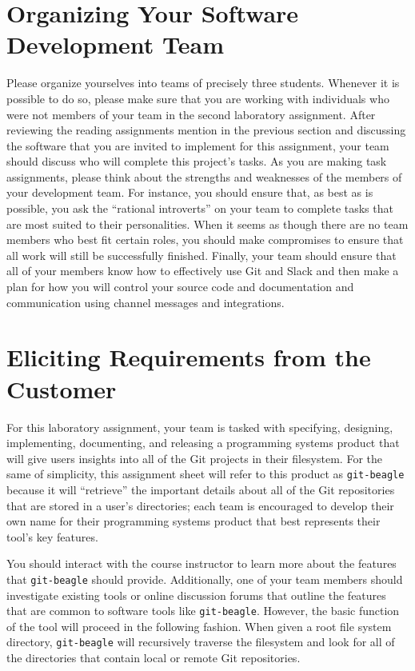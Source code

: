 \section*{Organizing Your Software Development Team}

Please organize yourselves into teams of precisely three students. Whenever it is possible to do so, please make sure that you are
working with individuals who were not members of your team in the second laboratory assignment. After reviewing the
reading assignments mention in the previous section and discussing the software that you are invited to implement for
this assignment, your team should discuss who will complete this project's tasks. As you are making task assignments,
please think about the strengths and weaknesses of the members of your development team. For instance, you should ensure
that, as best as is possible, you ask the ``rational introverts'' on your team to complete tasks that are most suited to
their personalities. When it seems as though there are no team members who best fit certain roles, you should make
compromises to ensure that all work will still be successfully finished. Finally, your team should ensure that all of
your members know how to effectively use Git and Slack and then make a plan for how you will control your source code
and documentation and communication using channel messages and integrations.

\section*{Eliciting Requirements from the Customer}

For this laboratory assignment, your team is tasked with specifying, designing, implementing, documenting, and releasing
a programming systems product that will give users insights into all of the Git projects in their filesystem. For the
same of simplicity, this assignment sheet will refer to this product as {\tt git-beagle} because it will ``retrieve''
the important details about all of the Git repositories that are stored in a user's directories; each team is encouraged
to develop their own name for their programming systems product that best represents their tool's key features.

You should interact with the course instructor to learn more about the features that {\tt git-beagle} should provide.
Additionally, one of your team members should investigate existing tools or online discussion forums that outline the
features that are common to software tools like {\tt git-beagle}. However, the basic function of the tool will proceed
in the following fashion. When given a root file system directory, {\tt git-beagle} will recursively traverse the
filesystem and look for all of the directories that contain local or remote Git repositories.

